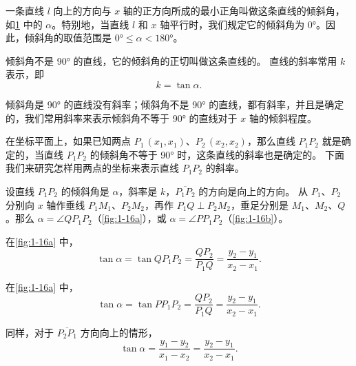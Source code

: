 一条直线 $l$ 向上的方向与 $x$ 轴的正方向所成的最小正角叫做这条直线的倾斜角，如\cref{fig:1-15} 中的 $\alpha$。特别地，当直线 $l$ 和 $x$ 轴平行时，我们规定它的倾斜角为 \ang{0}。因此，倾斜角的取值范围是 $\ang{0}\leqslant\alpha<\ang{180}$。
\begin{figure}
  \caption{}\label{fig:1-15}
\end{figure}

倾斜角不是 \ang{90} 的直线，它的倾斜角的正切叫做这条直线的。
直线的斜率常用 $k$ 表示，即
\[ k = \tan\alpha. \]

倾斜角是 \ang{90} 的直线没有斜率；倾斜角不是 \ang{90} 的直线，都有斜率，并且是确定的，我们常用斜率来表示倾斜角不等于 \ang{90} 的直线对于 $x$ 轴的倾斜程度。

在坐标平面上，如果已知两点 $P_1\,(x_1,x_1)$、$P_2\,(x_2,x_2)$，那么直线 $P_1P_2$ 就是确定的，当直线 $P_1P_2$ 的倾斜角不等于 \ang{90} 时，这条直线的斜率也是确定的。
下面我们来研究怎样用两点的坐标来表示直线 $P_1P_2$ 的斜率。

设直线 $P_1P_2$ 的倾斜角是 $\alpha$，斜率是 $k$，$\overline{P_1P_2}$ 的方向是向上的方向。
从 $P_1$、$P_2$ 分别向 $x$ 轴作垂线 $P_1M_1$、$P_2M_2$，再作 $P_1Q \perp P_2M_2$，垂足分别是 $M_1$、$M_2$、$Q$。那么 $\alpha = \angle QP_1P_2$（\cref{fig:1-16a}），或 $\alpha = \angle PP_1P_2$（\cref{fig:1-16b}）。
\begin{figure}
  \begin{minipage}[b]{0.48\linewidth}\centering
    \subcaption{}\label{fig:1-16a}
  \end{minipage}
  \begin{minipage}[b]{0.48\linewidth}\centering
    \subcaption{}\label{fig:1-16b}
  \end{minipage}
  \caption{}\label{fig:1-16}
\end{figure}

在\cref{fig:1-16a} 中，
\[ \tan\alpha =\tan QP_1P_2 =\frac{QP_2}{P_1Q}=\frac{y_2-y_1}{x_2-x_1}.\]

在\cref{fig:1-16a} 中，
\[ \tan\alpha =\tan PP_1P_2 =\frac{QP_2}{P_1Q}=\frac{y_2-y_1}{x_2-x_1}.\]

同样，对于 $\overline{P_2P_1}$ 方向向上的情形，
\[ \tan\alpha= \frac{y_1-y_2}{x_1-x_2}=\frac{y_2-y_1}{x_2-x_1}. \]

